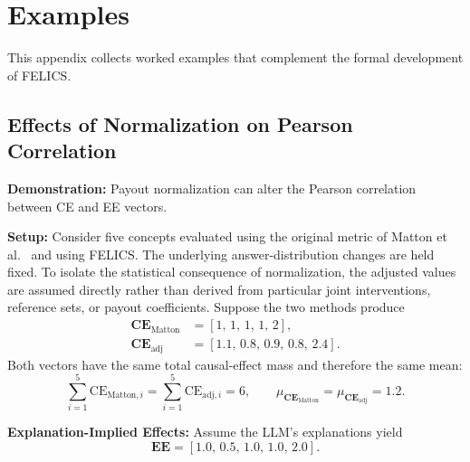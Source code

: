 \chapter{Examples}
\label{app:examples}
This appendix collects worked examples that complement the formal development of FELICS.

\section*{Effects of Normalization on Pearson Correlation}
\begin{example_box}[label=ex:payout_normalization_correlation]
    \textbf{Demonstration:} Payout normalization can alter the Pearson correlation between CE and EE vectors.

    \smallskip
    \textbf{Setup:} Consider five concepts evaluated using the original metric of Matton et al.~\cite{mattonWalkTalkMeasuring2024} and using FELICS. The underlying answer-distribution changes are held fixed. To isolate the statistical consequence of normalization, the adjusted values are assumed directly rather than derived from particular joint interventions, reference sets, or payout coefficients. Suppose the two methods produce
    \begin{align}
        \mathbf{CE}_{\mathrm{Matton}} & = \left[1,\,1,\,1,\,1,\,2\right], \\
        \mathbf{CE}_{\mathrm{adj}}    & = \left[1.1,\,0.8,\,0.9,\,0.8,\,2.4\right].
    \end{align}
    Both vectors have the same total causal-effect mass and therefore the same mean:
    \begin{equation}
        \sum_{i=1}^{5}\mathrm{CE}_{\mathrm{Matton},i}
        =\sum_{i=1}^{5}\mathrm{CE}_{\mathrm{adj},i}=6,
        \qquad
        \mu_{\mathbf{CE}_{\mathrm{Matton}}}
        =\mu_{\mathbf{CE}_{\mathrm{adj}}}=1.2.
    \end{equation}

    \smallskip
    \textbf{Explanation-Implied Effects:} Assume the LLM’s explanations yield
    \begin{equation}
        \mathbf{EE} = \left[1.0,\, 0.5,\, 1.0,\, 1.0,\, 2.0\right].
    \end{equation}


\end{example_box}
